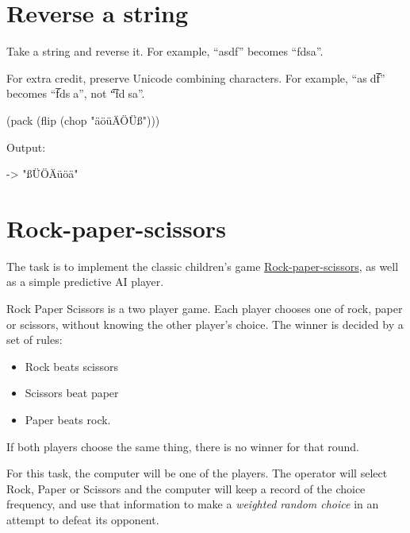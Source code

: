 \pagebreak{}
\section*{Reverse a string}

Take a string and reverse it. For example, ``asdf'' becomes ``fdsa''.

For extra credit, preserve Unicode combining characters. For example,
``as⃝df̅'' becomes ``f̅ds⃝a'', not ``̅fd⃝sa''.

\begin{wideverbatim}

(pack (flip (chop "äöüÄÖÜß")))

Output:

-> "ßÜÖÄüöä"

\end{wideverbatim}



\pagebreak{}
\section*{Rock-paper-scissors}

The task is to implement the classic children's game
\href{http://en.wikipedia.org/wiki/Rock-paper-scissors}{Rock-paper-scissors},
as well as a simple predictive AI player.

Rock Paper Scissors is a two player game. Each player chooses one of
rock, paper or scissors, without knowing the other player's choice. The
winner is decided by a set of rules:

\begin{itemize}
\item
  Rock beats scissors
\item
  Scissors beat paper
\item
  Paper beats rock.
\end{itemize}

If both players choose the same thing, there is no winner for that
round.

For this task, the computer will be one of the players. The operator
will select Rock, Paper or Scissors and the computer will keep a record
of the choice frequency, and use that information to make a
\emph{weighted random choice} in an attempt
to defeat its opponent.

